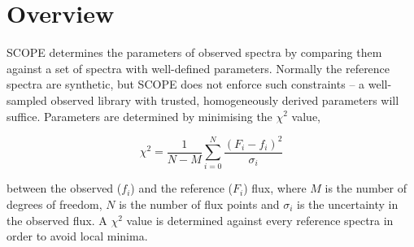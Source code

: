 \documentclass{emulateapj}
\begin{document}
\section{Overview}
SCOPE determines the parameters of observed spectra by comparing them against a set of spectra with well-defined parameters. Normally the reference spectra are synthetic, but SCOPE does not enforce such constraints \--- a well-sampled observed library with trusted, homogeneously derived parameters will suffice. Parameters are determined by minimising the $\chi^2$ value,

\begin{equation}
\chi^2 = \frac{1}{N-M}\sum\limits_{i=0}^{N}\frac{(F_i - f_i)^2}{\sigma_i}
\end{equation}

\noindent{}between the observed ($f_i$) and the reference ($F_i$) flux, where $M$ is the number of degrees of freedom, $N$ is the number of flux points and $\sigma_i$ is the uncertainty in the observed flux. A $\chi^2$ value is determined against every reference spectra in order to avoid local minima.
\end{document}
